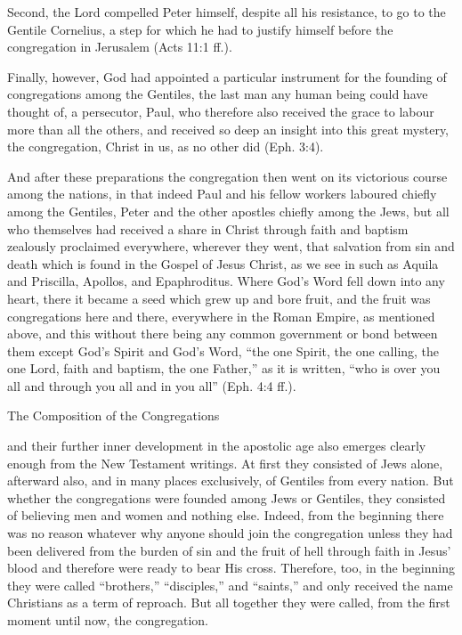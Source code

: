 Second, the Lord compelled Peter himself, despite all his resistance, to go to the Gentile Cornelius, a step for which he had to justify himself before the congregation in Jerusalem (Acts 11:1 ff.).

Finally, however, God had appointed a particular instrument for the founding of congregations among the Gentiles, the last man any human being could have thought of, a persecutor, Paul, who therefore also received the grace to labour more than all the others, and received so deep an insight into this great mystery, the congregation, Christ in us, as no other did (Eph. 3:4).

And after these preparations the congregation then went on its victorious course among the nations, in that indeed Paul and his fellow workers laboured chiefly among the Gentiles, Peter and the other apostles chiefly among the Jews, but all who themselves had received a share in Christ through faith and baptism zealously proclaimed everywhere, wherever they went, that salvation from sin and death which is found in the Gospel of Jesus Christ, as we see in such as Aquila and Priscilla, Apollos, and Epaphroditus. Where God’s Word fell down into any heart, there it became a seed which grew up and bore fruit, and the fruit was congregations here and there, everywhere in the Roman Empire, as mentioned above, and this without there being any common government or bond between them except God’s Spirit and God’s Word, “the one Spirit, the one calling, the one Lord, faith and baptism, the one Father,” as it is written, “who is over you all and through you all and in you all” (Eph. 4:4 ff.).








The Composition of the Congregations

and their further inner development in the apostolic age also emerges clearly enough from the New Testament writings. At first they consisted of Jews alone, afterward also, and in many places exclusively, of Gentiles from every nation. But whether the congregations were founded among Jews or Gentiles, they consisted of believing men and women and nothing else. Indeed, from the beginning there was no reason whatever why anyone should join the congregation unless they had been delivered from the burden of sin and the fruit of hell through faith in Jesus’ blood and therefore were ready to bear His cross. Therefore, too, in the beginning they were called “brothers,” “disciples,” and “saints,” and only received the name Christians as a term of reproach. But all together they were called, from the first moment until now, the congregation.

